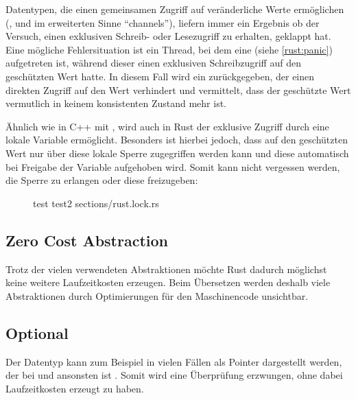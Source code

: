 Datentypen, die einen gemeinsamen Zugriff auf veränderliche Werte ermöglichen (,  und im erweiterten Sinne \enquote{channels}), liefern immer ein Ergebnis ob der Versuch, einen exklusiven Schreib- oder Lesezugriff zu erhalten, geklappt hat.
Eine mögliche Fehlersituation ist ein Thread, bei dem eine  (siehe \autoref{rust:panic}) aufgetreten ist, während dieser einen exklusiven Schreibzugriff auf den geschützten Wert hatte.
In diesem Fall wird ein  zurückgegeben, der einen direkten Zugriff auf den Wert verhindert und vermittelt, dass der geschützte Wert vermutlich in keinem konsistenten Zustand mehr ist.

Ähnlich wie in C++ mit , wird auch in Rust der exklusive Zugriff durch eine lokale Variable ermöglicht.
Besonders ist hierbei jedoch, dass auf den geschützten Wert nur über diese lokale Sperre zugegriffen werden kann und diese automatisch bei Freigabe der Variable aufgehoben wird.
Somit kann nicht vergessen werden, die Sperre zu erlangen oder diese freizugeben:

\begin{figure}[H]
	\rustcinclude
		{test}
		{test2}
		{sections/rust.lock.rs}
\end{figure}



\subsection{Zero Cost Abstraction}
\label{rust:zero_cost}

Trotz der vielen verwendeten Abstraktionen möchte Rust dadurch möglichst keine weitere Laufzeitkosten erzeugen.
Beim Übersetzen werden deshalb viele Abstraktionen durch Optimierungen für den Maschinencode unsichtbar.

\subsection{Optional}
\label{rust:zero_cost:optional}

Der  Datentyp kann zum Beispiel in vielen Fällen als Pointer dargestellt werden, der bei   und ansonsten  ist \cite[100]{rust:orly_programming}.
Somit wird eine Überprüfung erzwungen, ohne dabei Laufzeitkosten erzeugt zu haben.

